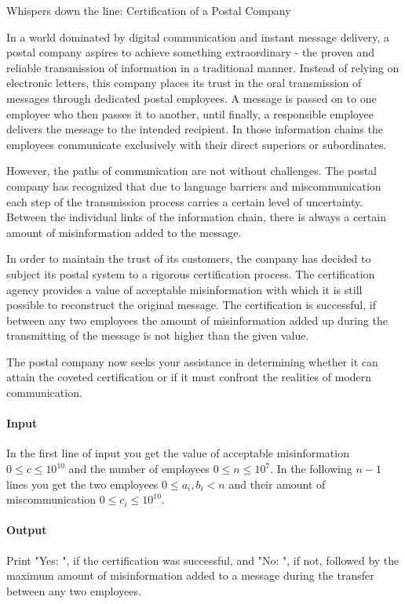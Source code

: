 



\makeheader

Whispers down the line: Certification of a Postal Company

In a world dominated by digital communication and instant message delivery, a postal company aspires to achieve something extraordinary - the proven and reliable transmission of information in a traditional manner. 
Instead of relying on electronic letters, this company places its trust in the oral transmission of messages through dedicated postal employees. 
A message is passed on to one employee who then passes it to another, until finally, a responsible employee delivers the message to the intended recipient. 
In those information chains the employees communicate exclusively with their direct superiors or subordinates.

However, the paths of communication are not without challenges. 
The postal company has recognized that due to language barriers and miscommunication each step of the transmission process carries a certain level of uncertainty. 
Between the individual links of the information chain, there is always a certain amount of misinformation added to the message.

In order to maintain the trust of its customers, the company has decided to subject its postal system to a rigorous certification process.
The certification agency provides a value of acceptable misinformation with which it is still possible to reconstruct the original message.
The certification is successful, if between any two employees the amount of misinformation added up during the transmitting of the message is not higher than the given value.

The postal company now seeks your assistance in determining whether it can attain the coveted certification or if it must confront the realities of modern communication.


\paragraph*{Input}

In the first line of input you get the value of acceptable misinformation $0 \leq c \leq 10^{10}$ and the number of employees $0 \leq n \leq 10^7.$
In the following $n-1$ lines you get the two employees $0 \leq a_i, b_i < n$ and their amount of miscommunication $0 \leq c_i \leq 10^{10}.$

\paragraph*{Output}

Print "Yes: ", if the certification was successful, and "No: ", if not, followed by the maximum amount of misinformation added to a message during the transfer between any two employees.

\begin{samples}
\end{samples}


